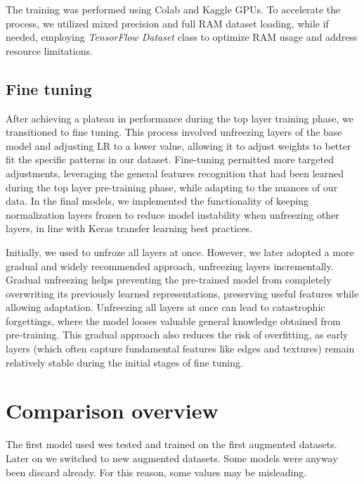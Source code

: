 \documentclass[11pt]{article}
\begin{document}
\begin{multicols}{2}
        The training was performed using Colab and Kaggle GPUs. To accelerate the process, we utilized mixed precision and full RAM dataset loading, while if needed, employing \textit{TensorFlow Dataset} class to optimize RAM usage and address resource limitations.
        
        \subsection{Fine tuning}
        
        After achieving a plateau in performance during the top layer training phase, we transitioned to fine tuning. 
        This process involved unfreezing layers of the base model and adjusting LR to a lower value, allowing it to adjust weights to better fit the specific patterns in our dataset. 
        Fine-tuning permitted more targeted adjustments, leveraging the general features recognition that had been learned during the top layer pre-training phase, while adapting to the nuances of our data. In the final models, we implemented the functionality of keeping normalization layers frozen to reduce model instability when unfreezing other layers, in line with Keras transfer learning best practices.
        
        Initially, we used to unfroze all layers at once. 
        However, we later adopted a more gradual and widely recommended approach, unfreezing layers incrementally. 
        Gradual unfreezing helps preventing the pre-trained model from completely overwriting its previously learned representations, preserving useful features while allowing adaptation. Unfreezing all layers at once can lead to catastrophic forgettings, where the model looses valuable general knowledge obtained from pre-training.
        This gradual approach also reduces the risk of overfitting, as early layers (which often capture fundamental features like edges and textures) remain relatively stable during the initial stages of fine tuning.
        
        \section{Comparison overview}
        
        The first model used wes tested and trained on the first augmented datasets.
        Later on we switched to new augmented datasets. 
        Some models were anyway been discard already. 
        For this reason, some values may be misleading.
        

\end{multicols}
\end{document}
